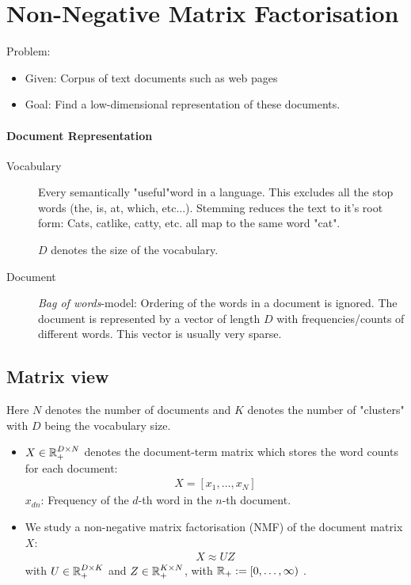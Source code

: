 \section{Non-Negative Matrix Factorisation}

Problem:
\begin{itemize}
    \item Given: Corpus of text documents such as web pages
    \item Goal: Find a low-dimensional representation of these documents. 
\end{itemize}

\paragraph{Document Representation}
\begin{description}
\item[Vocabulary] Every semantically "useful"word in a language. This excludes all the stop words (the, is, at, which, etc...). Stemming reduces the text to it's root form: Cats, catlike, catty, etc. all map to the same word "cat".


$D$ denotes the size of the vocabulary.

\item[Document] \emph{Bag of words}-model: Ordering of the words in a document is ignored. The document is represented by a vector of length $D$ with frequencies/counts of different words. This vector is usually very sparse.
\end{description}

\subsection{Matrix view} Here $N$ denotes the number of documents and $K$ denotes the number of "clusters" with $D$ being the vocabulary size.
\begin{itemize}
    \item $X \in \mathbb{R}_+^{D\times N}$ denotes the document-term matrix which stores the word counts for each document:
        \begin{align*}
            X = [x_1,\ldots, x_N]
        \end{align*}
        $x_{dn}$: Frequency of the $d$-th word in the $n$-th document.
    \item We study a non-negative matrix factorisation (NMF) of the document matrix $X$:
        \begin{align*}
            X\approx UZ
        \end{align*}
        with $U\in \mathbb{R}_+^{D\times K}$ and $Z\in \mathbb{R}_+^{K\times N}$, with $\mathbb{R}_+ := [0,\ldots, \infty)$ . 
\end{itemize}

